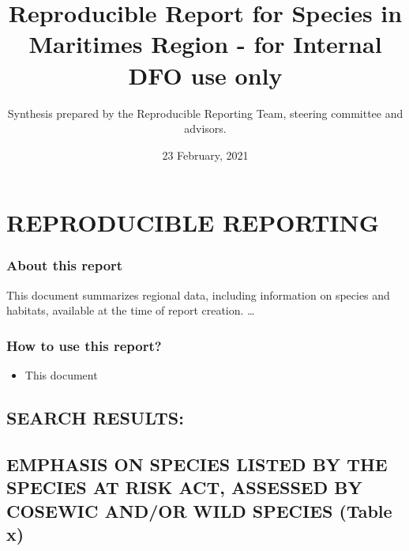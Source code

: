 \documentclass[
]{article}
\title{Reproducible Report for Species in Maritimes Region - for Internal DFO
use only}
\author{Synthesis prepared by the Reproducible Reporting Team, steering
committee and advisors.}
\date{23 February, 2021}
\providecommand{\tightlist}{%
  \setlength{\itemsep}{0pt}\setlength{\parskip}{0pt}}
\begin{document}
\maketitle

{
\setcounter{tocdepth}{2}
\tableofcontents
}
\hypertarget{reproducible-reporting}{%
\section{\texorpdfstring{\textbf{REPRODUCIBLE
REPORTING}}{REPRODUCIBLE REPORTING}}\label{reproducible-reporting}}

\hypertarget{about-this-report}{%
\subsubsection{\texorpdfstring{\textbf{About this
report}}{About this report}}\label{about-this-report}}

This document summarizes regional data, including information on species
and habitats, available at the time of report creation. \ldots{}

\hypertarget{how-to-use-this-report}{%
\subsubsection{\texorpdfstring{\textbf{How to use this
report?}}{How to use this report?}}\label{how-to-use-this-report}}

\begin{itemize}
\tightlist
\item
  This document
\end{itemize}

\newpage

\hypertarget{search-results}{%
\subsection{\texorpdfstring{\textbf{SEARCH
RESULTS:}}{SEARCH RESULTS:}}\label{search-results}}

\hypertarget{emphasis-on-species-listed-by-the-species-at-risk-act-assessed-by-cosewic-andor-wild-species-table-x}{%
\subsection{\texorpdfstring{\textbf{EMPHASIS ON SPECIES LISTED BY THE
SPECIES AT RISK ACT, ASSESSED BY COSEWIC AND/OR WILD SPECIES (Table
x)}}{EMPHASIS ON SPECIES LISTED BY THE SPECIES AT RISK ACT, ASSESSED BY COSEWIC AND/OR WILD SPECIES (Table x)}}\label{emphasis-on-species-listed-by-the-species-at-risk-act-assessed-by-cosewic-andor-wild-species-table-x}}
\end{document}
